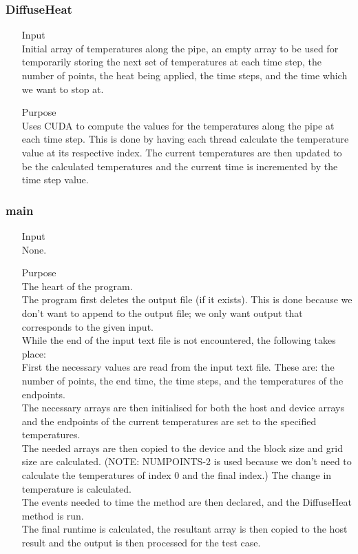 \documentclass{article}
\begin{document}
\subsubsection{DiffuseHeat}
\begin{itemize}
	\item[Input] \hfill\\
	Initial array of temperatures along the pipe, an empty array to be used for temporarily storing the next set of temperatures at each time step, the number of points, the heat being applied, the time steps, and the time which we want to stop at.
	\item[Purpose] \hfill\\
	Uses CUDA to compute the values for the temperatures along the pipe at each time step. This is done by having each thread calculate the temperature value at its respective index. The current temperatures are then updated to be the calculated temperatures and the current time is incremented by the time step value.
\end{itemize}

\subsubsection{main}
\begin{itemize}
	\item[Input] \hfill\\
	None.
	\item[Purpose] \hfill\\
	The heart of the program.\\
	The program first deletes the output file (if it exists). This is done because we don't want to append to the output file; we only want output that corresponds to the given input.\\
	While the end of the input text file is not encountered, the following takes place:\\
	First the necessary values are read from the input text file. These are: the number of points, the end time, the time steps, and the temperatures of the endpoints.\\
	The necessary arrays are then initialised for both the host and device arrays and the endpoints of the current temperatures are set to the specified temperatures.\\
	The needed arrays are then copied to the device and the block size and grid size are calculated. (NOTE: NUMPOINTS-2 is used because we don't need to calculate the temperatures of index 0 and the final index.)
	The change in temperature is calculated.\\
	The events needed to time the method are then declared, and the DiffuseHeat method is run.\\
	The final runtime is calculated, the resultant array is then copied to the host result and the output is then processed for the test case.
\end{itemize}
\end{document}
